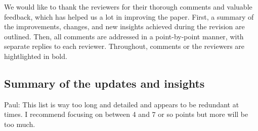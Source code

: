 \documentclass[11pt]{report}
\begin{document}
We would like to thank the reviewers for their thorough comments and valuable feedback, which has helped us a lot in improving the paper. First, a summary of the improvements, changes, and new insights achieved during the revision are outlined. Then, all comments are addressed in a point-by-point manner, with separate replies to each reviewer. 
Throughout, comments or the reviewers are hightlighted in bold.

\noindent \hdashrule{12.5cm}{0.2pt}{2mm 1pt}

\subsection*{Summary of the updates and insights}

{\color{blue} Paul: This list is way too long and detailed and appears to be redundant at times. I recommend focusing on between 4 and 7 or so points but more will be too much.}
\end{document}
